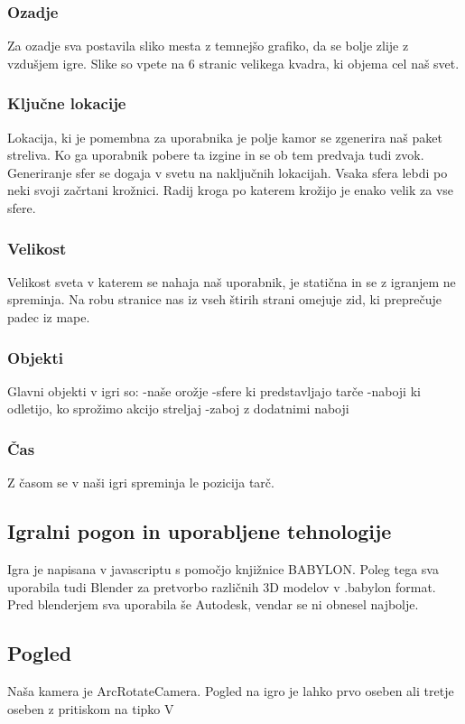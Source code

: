 \documentclass[a4paper]{article}
\begin{document}
\subsubsection{Ozadje}
Za ozadje sva postavila sliko mesta z temnejšo grafiko, da se bolje zlije z vzdušjem igre. Slike so vpete na 6 stranic velikega kvadra, ki objema cel naš svet.

\subsubsection{Ključne lokacije}
Lokacija, ki je pomembna za uporabnika je polje kamor se zgenerira naš paket streliva. Ko ga uporabnik pobere ta izgine in se ob tem predvaja tudi zvok. 
Generiranje sfer se dogaja v svetu na naključnih lokacijah. Vsaka sfera lebdi po neki svoji začrtani krožnici. 
Radij kroga po katerem krožijo je enako velik za vse sfere.

\subsubsection{Velikost}
Velikost sveta v katerem se nahaja naš uporabnik, je statična in se z igranjem ne spreminja. Na robu stranice nas iz vseh štirih strani omejuje zid, ki preprečuje padec iz mape.

\subsubsection{Objekti}
Glavni objekti v igri so:
-naše orožje
-sfere ki predstavljajo tarče
-naboji ki odletijo, ko sprožimo akcijo streljaj
-zaboj z dodatnimi naboji

\subsubsection{Čas}
Z časom se v naši igri spreminja le pozicija tarč.

\subsection{Igralni pogon in uporabljene tehnologije}
Igra je napisana v javascriptu s pomočjo knjižnice BABYLON. Poleg tega sva uporabila tudi Blender za pretvorbo različnih 3D modelov v .babylon format. 
Pred blenderjem sva uporabila še Autodesk, vendar se ni obnesel najbolje.

\subsection{Pogled}
Naša kamera je ArcRotateCamera. Pogled na igro je lahko prvo oseben ali tretje oseben z pritiskom na tipko V
\end{document}
